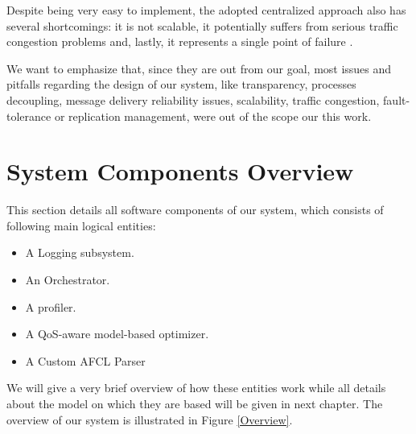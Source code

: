 \documentclass[12pt,a4paper]{report}
\begin{document}
Despite being very easy to implement, the adopted centralized approach also has several shortcomings: it is not scalable, it potentially suffers from serious traffic congestion problems and, lastly, it represents a single point of failure \cite{SDCC}. 

We want to emphasize that, since they are out from our goal, most issues and pitfalls regarding the design of our system, like transparency, processes decoupling, message delivery reliability issues, scalability, traffic congestion, fault-tolerance or replication management, were out of the scope our this work.

\section{System Components Overview}

This section details all software components of our system, which consists of following main logical entities:

\begin{itemize}
	\item A Logging subsystem.
	\item An Orchestrator.
	\item A profiler.
	\item A QoS-aware model-based optimizer.
	\item A Custom AFCL Parser
\end{itemize}

We will give a very brief overview of how these entities work while all details about the model on which they are based will be given in next chapter. The overview of our system is illustrated in Figure \ref{Overview}.
\end{document}
